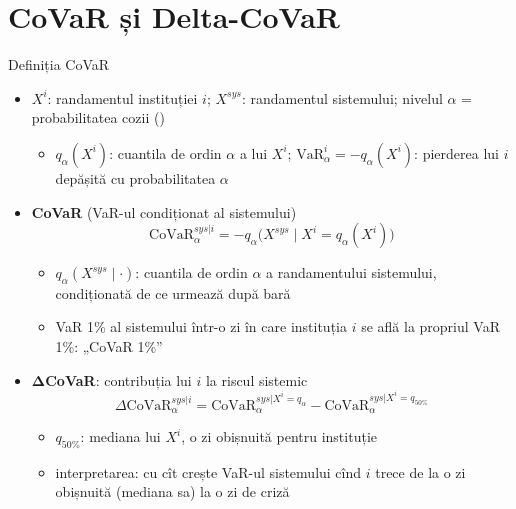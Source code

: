 \section{CoVaR și Delta-CoVaR}

\begin{frame}{Definiția CoVaR}
\itemsize{\small}
\begin{itemize}
    \item $X^i$: randamentul instituției $i$; $X^{sys}$: randamentul sistemului; nivelul $\alpha$ = probabilitatea cozii ()
    \begin{itemize}
        \item $q_\alpha(X^i)$: cuantila de ordin $\alpha$ a lui $X^i$; $\mathrm{VaR}^i_\alpha = -q_\alpha(X^i)$: pierderea lui $i$ depășită cu probabilitatea $\alpha$
    \end{itemize}
    \item \textbf{CoVaR} (VaR-ul condiționat al sistemului)  \begin{equation*} \mathrm{CoVaR}^{sys|i}_\alpha = -q_\alpha\big(X^{sys} \mid X^i = q_\alpha(X^i)\big) \end{equation*}
    \begin{itemize}
        \item $q_\alpha(X^{sys} \mid \cdot)$: cuantila de ordin $\alpha$ a randamentului sistemului, condiționată de ce urmează după bară
        \item VaR 1\% al sistemului într-o zi în care instituția $i$ se află la propriul VaR 1\%: „CoVaR 1\%”
    \end{itemize}
    \item $\boldsymbol{\Delta}$\textbf{CoVaR}: contribuția lui $i$ la riscul sistemic \begin{equation*} \Delta\mathrm{CoVaR}^{sys|i}_\alpha = \mathrm{CoVaR}^{sys|X^i = q_\alpha}_\alpha - \mathrm{CoVaR}^{sys|X^i = q_{50\%}}_\alpha \end{equation*}
    \begin{itemize}
        \item $q_{50\%}$: mediana lui $X^i$, o zi obișnuită pentru instituție
        \item interpretarea: cu cît crește VaR-ul sistemului cînd $i$ trece de la o zi obișnuită (mediana sa) la o zi de criză
    \end{itemize}
\end{itemize}
\end{frame}

